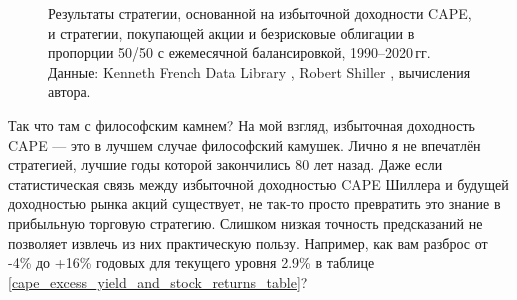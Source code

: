 \begin{figure}[ht]
\centering
{}
\caption{Результаты стратегии, основанной на избыточной доходности CAPE, и 
стратегии, покупающей акции и безрисковые облигации в пропорции 50/50 с 
ежемесячной балансировкой, 1990--2020\,гг. Данные: Kenneth French Data Library 
\cite{kennethFrench}, Robert Shiller \cite{shillerOnline}, вычисления автора.}
\label{cape_strategy_1990}
\end{figure}

Так что там с философским камнем? На мой взгляд, избыточная доходность 
CAPE --- это в лучшем случае философский камушек. Лично я не впечатлён 
стратегией, лучшие годы которой закончились 80 лет назад. Даже если 
статистическая связь между избыточной доходностью CAPE Шиллера и будущей 
доходностью рынка акций существует, не так-то просто превратить это знание 
в прибыльную торговую стратегию. Слишком низкая точность предсказаний 
не позволяет извлечь из них практическую пользу. Например, как вам разброс от 
-4\% до +16\% годовых для текущего уровня 2.9\% в таблице 
\ref{cape_excess_yield_and_stock_returns_table}?

